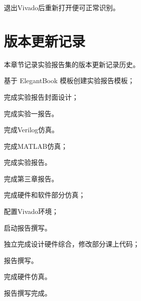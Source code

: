 \documentclass[lang=cn,newtx,10pt,scheme=chinese]{elegantbook}
\begin{document}
退出Vivado后重新打开便可正常识别。
\appendix
\chapter{版本更新记录}
本章节记录实验报告集的版本更新记录历史。

\begin{change}
  \item 基于 ElegantBook 模板创建实验报告模板；
  \item 完成实验报告封面设计；
  \item 完成实验一报告。
\end{change}

\begin{change}
  \item 完成Verilog仿真。
\end{change}

\begin{change}
\item 完成MATLAB仿真；
\item 完成实验报告。
\end{change}

\begin{change}
\item 完成第三章报告。
\end{change}

\begin{change}
\item 完成硬件和软件部分仿真；
\item 配置Vivado环境；
\item 启动报告撰写。
\end{change}

\begin{change}
\item 独立完成设计硬件综合，修改部分课上代码；
\item 报告撰写。
\end{change}

\begin{change}
  \item 完成硬件仿真。
  \item 报告撰写完成。
\end{change}
\end{document}

